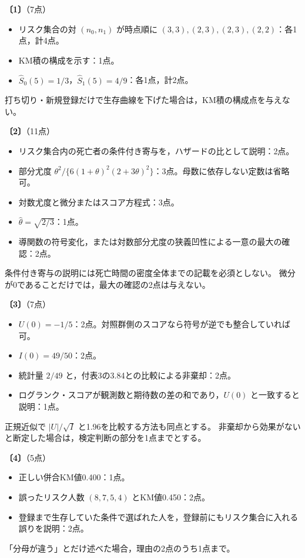 \documentclass[a4paper,11pt]{ltjsarticle}
\renewcommand{\ans}[1]{\par\medskip\noindent\textbf{〔#1〕}\quad}
\renewcommand{\points}[1]{\hfill\textnormal{（#1点）}\par\nobreak}
\begin{document}
\ans{1}\points{7}
\begin{itemize}
\item リスク集合の対 $(n_0,n_1)$ が時点順に $(3,3),(2,3),(2,3),(2,2)$：各1点，計4点。
\item KM積の構成を示す：1点。
\item $\hat S_0(5)=1/3$，$\hat S_1(5)=4/9$：各1点，計2点。
\end{itemize}
打ち切り・新規登録だけで生存曲線を下げた場合は，KM積の構成点を与えない。

\ans{2}\points{11}
\begin{itemize}
\item リスク集合内の死亡者の条件付き寄与を，ハザードの比として説明：2点。
\item 部分尤度 $\theta^2/\{6(1+\theta)^2(2+3\theta)^2\}$：3点。母数に依存しない定数は省略可。
\item 対数尤度と微分またはスコア方程式：3点。
\item $\hat\theta=\sqrt{2/3}$：1点。
\item 導関数の符号変化，または対数部分尤度の狭義凹性による一意の最大の確認：2点。
\end{itemize}
条件付き寄与の説明には死亡時間の密度全体までの記載を必須としない。
微分が0であることだけでは，最大の確認の2点は与えない。

\ans{3}\points{7}
\begin{itemize}
\item $U(0)=-1/5$：2点。対照群側のスコアなら符号が逆でも整合していれば可。
\item $I(0)=49/50$：2点。
\item 統計量 $2/49$ と，付表3の3.84との比較による非棄却：2点。
\item ログランク・スコアが観測数と期待数の差の和であり，$U(0)$ と一致すると説明：1点。
\end{itemize}
正規近似で $|U|/\sqrt I$ と1.96を比較する方法も同点とする。
非棄却から効果がないと断定した場合は，検定判断の部分を1点までとする。

\ans{4}\points{5}
\begin{itemize}
\item 正しい併合KM値0.400：1点。
\item 誤ったリスク人数 $(8,7,5,4)$ とKM値0.450：2点。
\item 登録まで生存していた条件で選ばれた人を，登録前にもリスク集合に入れる誤りを説明：2点。
\end{itemize}
「分母が違う」とだけ述べた場合，理由の2点のうち1点まで。
\newpage
\end{document}
